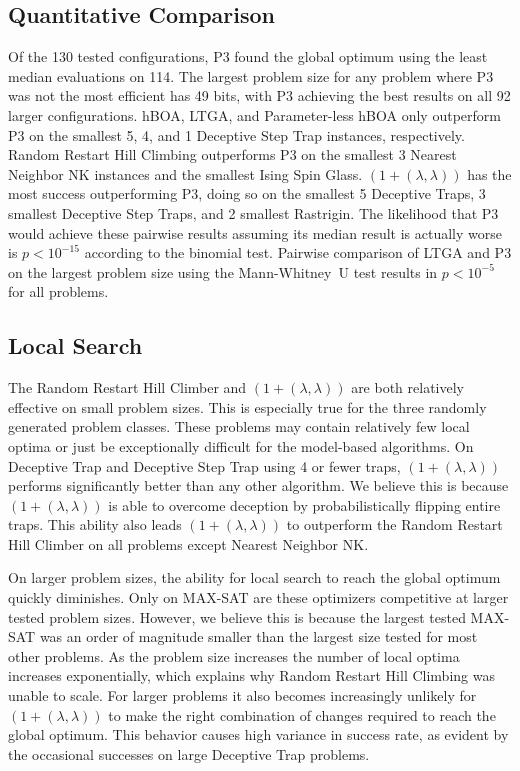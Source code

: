 \subsection{Quantitative Comparison}
Of the 130 tested configurations, P3 found the global optimum using the least median evaluations on 114.
The largest problem size for any problem where P3 was not the most efficient has 49 bits, with P3 achieving the best results on all 92 larger
configurations. hBOA, LTGA, and Parameter-less hBOA only outperform P3 on the smallest 5, 4, and 1 Deceptive
Step Trap instances, respectively. Random Restart Hill Climbing outperforms P3 on the smallest 3 Nearest Neighbor NK instances
and the smallest Ising Spin Glass. $(1+(\lambda, \lambda))$ has the most success outperforming P3, doing so
on the smallest 5 Deceptive Traps, 3 smallest Deceptive Step Traps, and 2 smallest Rastrigin.
The likelihood that P3 would achieve these pairwise results assuming its median result is actually worse is $p < 10^{-15}$
according to the binomial test.
Pairwise comparison of LTGA and P3 on the largest problem size using the Mann-Whitney~U test results in
$p < 10^{-5}$ for all problems.

\subsection{Local Search}
The Random Restart Hill Climber and $(1+(\lambda, \lambda))$ are both relatively effective on small problem
sizes. This is especially true for the three randomly generated problem classes. These problems
may contain relatively few local optima or just be exceptionally difficult for the model-based algorithms.
On Deceptive Trap and Deceptive Step Trap using 4 or fewer traps, $(1+(\lambda, \lambda))$ performs significantly
better than any other algorithm. We believe this is
because $(1+(\lambda, \lambda))$ is able to overcome deception by probabilistically
flipping entire traps.
This ability also leads $(1+(\lambda, \lambda))$
to outperform the Random Restart Hill Climber on all problems except Nearest Neighbor NK.

On larger problem sizes, the ability for local search to reach the global optimum quickly diminishes.
Only on MAX-SAT are these optimizers competitive
at larger tested problem sizes. However, we believe this is because the largest tested MAX-SAT
was an order of magnitude smaller than the largest size tested for most other problems. As the problem
size increases the number of local optima increases exponentially, which explains why Random Restart Hill
Climbing was unable to scale.
For larger problems it also becomes increasingly unlikely for $(1+(\lambda, \lambda))$ to make the right combination
of changes required to reach the global optimum. This
behavior causes high variance in success rate, as evident by the occasional successes on large Deceptive Trap problems.

